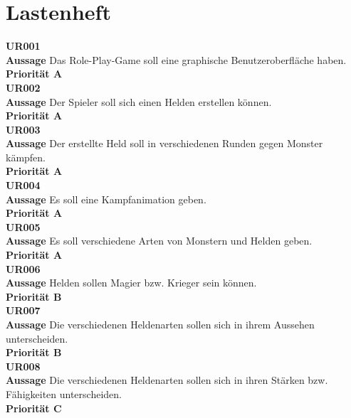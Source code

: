 \maketitle

\newpage

\tableofcontents

\newpage

\section{Lastenheft}
\label{Lastenheft}

\textbf{UR001}\\
\textbf{Aussage} Das Role-Play-Game soll eine graphische Benutzeroberfläche haben.\\
\textbf{Priorität A} \\

\textbf{UR002}\\
\textbf{Aussage} Der Spieler soll sich einen Helden erstellen können.\\
\textbf{Priorität A} \\

\textbf{UR003}\\
\textbf{Aussage} Der erstellte Held soll in verschiedenen Runden gegen Monster kämpfen.\\
\textbf{Priorität A} \\

\textbf{UR004}\\
\textbf{Aussage} Es soll eine Kampfanimation geben.\\
\textbf{Priorität A}\\

\textbf{UR005}\\
\textbf{Aussage} Es soll verschiedene Arten von Monstern und Helden geben.\\
\textbf{Priorität A}\\

\textbf{UR006}\\
\textbf{Aussage} Helden sollen Magier bzw. Krieger sein können.\\
\textbf{Priorität B}\\

\textbf{UR007}\\
\textbf{Aussage} Die verschiedenen Heldenarten sollen sich in ihrem Aussehen unterscheiden.\\
\textbf{Priorität B}\\

\textbf{UR008}\\
\textbf{Aussage} Die verschiedenen Heldenarten sollen sich in ihren Stärken bzw. Fähigkeiten unterscheiden.\\
\textbf{Priorität C}\\

